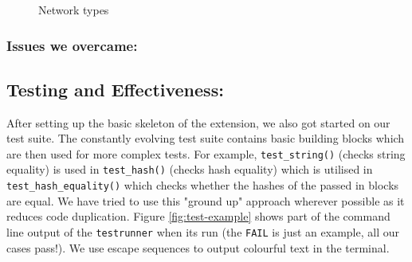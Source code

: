 \documentclass[a4paper]{article}
\begin{document}
\begin{figure}[htp]
    \centering
    \qquad
    \caption{Network types}
    \label{fig:network-types}
\end{figure}

\subsubsection{Issues we overcame: }
\lipsum[1-1]

\subsection{Testing and Effectiveness:}
After setting up the basic skeleton of the extension, we also got started on our test suite. The constantly evolving test suite contains basic building blocks which are then used for more complex tests. For example, \verb|test_string()| (checks string equality) is used in \verb|test_hash()| (checks hash equality) which is utilised in \verb|test_hash_equality()| which checks whether the hashes of the passed in blocks are equal. We have tried to use this "ground up" approach wherever possible as it reduces code duplication. Figure \ref{fig:test-example} shows part of the command line output of the \verb|testrunner| when its run (the \texttt{\textcolor{BOLDRED}{FAIL}} is just an example, all our cases pass!). We use escape sequences to output colourful text in the terminal.
\end{document}
